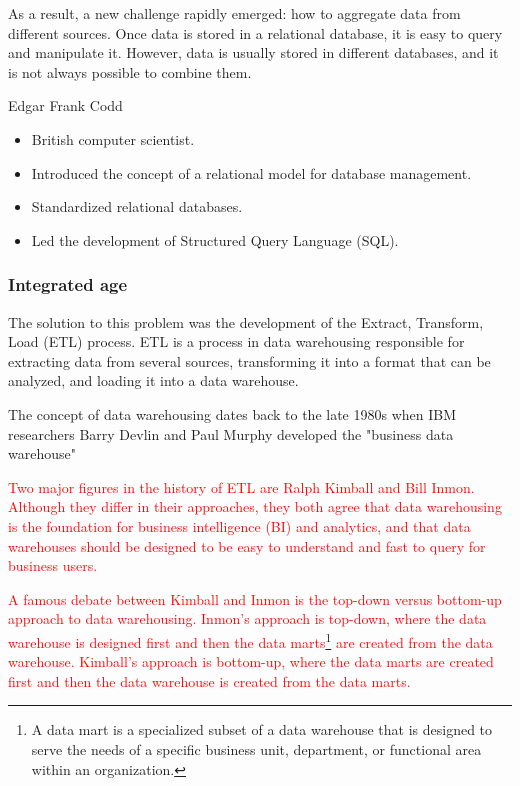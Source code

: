 As a result, a new challenge rapidly emerged: how to aggregate data from different
sources. Once data is stored in a relational database, it is easy to query and manipulate
it. However, data is usually stored in different databases, and it is not always possible
to combine them.

\begin{mainbox}{Edgar Frank Codd}
  \begin{itemize}
    \item British computer scientist.
    \item Introduced the concept of a relational model for database management.
    \item Standardized relational databases.
    \item Led the development of Structured Query Language (SQL).
  \end{itemize}
\end{mainbox}

\subsubsection{Integrated age}

The solution to this problem was the development of the Extract, Transform, Load (ETL)
process.  ETL is a process in data warehousing responsible for extracting data from
several sources, transforming it into a format that can be analyzed, and loading it into a
data warehouse.

The concept of data warehousing dates back to the late 1980s when IBM researchers Barry
Devlin and Paul Murphy developed the "business data warehouse"

\textcolor{red}{
Two major figures in the history of ETL are Ralph Kimball and Bill Inmon.  Although they
differ in their approaches, they both agree that data warehousing is the foundation for
business intelligence (BI) and analytics, and that data warehouses should be designed to
be easy to understand and fast to query for business users.
}

\textcolor{red}{
A famous debate between Kimball and Inmon is the top-down versus bottom-up approach to
data warehousing.  Inmon's approach is top-down, where the data warehouse is designed
first and then the data marts\footnote{A data mart is a specialized subset of a data warehouse that is designed to serve the needs of a specific business unit, department, or functional area within an organization.} are created from the data warehouse.  Kimball's approach is
bottom-up, where the data marts are created first and then the data warehouse is created
from the data marts.
}

